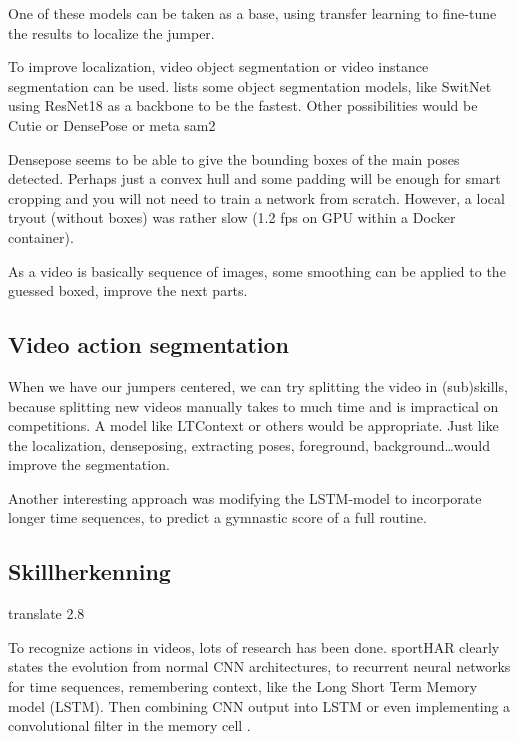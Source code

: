 One of these models can be taken as a base, using transfer learning to fine-tune the results to localize the jumper. %

To improve localization, video object segmentation or video instance segmentation can be used. \textcite{Gao_2022} lists some object segmentation models, like SwitNet using ResNet18 as a backbone to be the fastest.
Other possibilities would be Cutie %
or DensePose %
or meta sam2 %

Densepose seems to be able to give the bounding boxes of the main poses detected. Perhaps just a convex hull and some padding will be enough for smart cropping and you will not need to train a network from scratch. However, a local tryout (without boxes) was rather slow (1.2 fps on GPU within a Docker container).

As a video is basically sequence of images, some smoothing can be applied to the guessed boxed, improve the next parts.


\subsection{Video action segmentation}

When we have our jumpers centered, we can try splitting the video in (sub)skills, because splitting new videos manually takes to much time and is impractical on competitions.
A model like LTContext %
or others would be appropriate. %
Just like the localization, denseposing, extracting poses, foreground, background\dots would improve the segmentation.

Another interesting approach was \textcite{Zaidi_2021} modifying the LSTM-model to incorporate longer time sequences, to predict a gymnastic score of a full routine.

\subsection{Skillherkenning}
\label{subsec:skillherkenning}

translate 2.8

To recognize actions in videos, lots of research has been done. %
sportHAR clearly states the evolution from normal CNN architectures, to recurrent neural networks for time sequences, remembering context, like the Long Short Term Memory model (LSTM). Then combining CNN output into LSTM or even implementing a convolutional filter in the memory cell \autocite{Shi et all}. %


